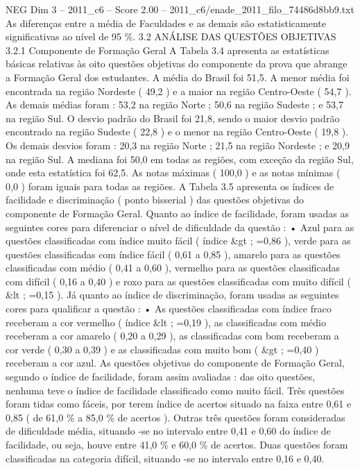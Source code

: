 \begin{textsample}{NEG Dim 3 – 2011\_c6 – Score 2.00 – 2011\_c6/enade\_2011\_filo\_74486d8bb9.txt}
As diferenças entre a média de Faculdades e as demais são estatisticamente significativas ao nível de 95 \%. 3.2 ANÁLISE DAS QUESTÕES OBJETIVAS 3.2.1 Componente de Formação Geral A Tabela 3.4 apresenta as estatísticas básicas relativas às oito questões objetivas do componente da prova que abrange a Formação Geral dos estudantes.
A média do Brasil foi 51,5.
A menor média foi encontrada na região Nordeste ( 49,2 ) e a maior na região Centro-Oeste ( 54,7 ).
As demais médias foram : 53,2 na região Norte ; 50,6 na região Sudeste ; e 53,7 na região Sul.
O desvio padrão do Brasil foi 21,8, sendo o maior desvio padrão encontrado na região Sudeste ( 22,8 ) e o menor na região Centro-Oeste ( 19,8 ).
Os demais desvios foram : 20,3 na região Norte ; 21,5 na região Nordeste ; e 20,9 na região Sul.
A mediana foi 50,0 em todas as regiões, com exceção da região Sul, onde esta estatística foi 62,5.
As notas máximas ( 100,0 ) e as notas mínimas ( 0,0 ) foram iguais para todas as regiões.
A Tabela 3.5 apresenta os índices de facilidade e discriminação ( ponto bisserial ) das questões objetivas do componente de Formação Geral.
Quanto ao índice de facilidade, foram usadas as seguintes cores para diferenciar o nível de dificuldade da questão : • Azul para as questões classificadas com índice muito fácil ( índice \&gt ; =0,86 ), verde para as questões classificadas com índice fácil ( 0,61 a 0,85 ), amarelo para as questões classificadas com médio ( 0,41 a 0,60 ), vermelho para as questões classificadas com difícil ( 0,16 a 0,40 ) e roxo para as questões classificadas com muito difícil ( \&lt ; =0,15 ).
Já quanto ao índice de discriminação, foram usadas as seguintes cores para qualificar a questão : • As questões classificadas com índice fraco receberam a cor vermelho ( índice \&lt ; =0,19 ), as classificadas com médio receberam a cor amarelo ( 0,20 a 0,29 ), as classificadas com bom receberam a cor verde ( 0,30 a 0,39 ) e as classificadas com muito bom ( \&gt ; =0,40 ) receberam a cor azul.
As questões objetivas do componente de Formação Geral, segundo o índice de facilidade, foram assim avaliadas : das oito questões, nenhuma teve o índice de facilidade classificado como muito fácil.
Três questões foram tidas como fáceis, por terem índice de acertos situado na faixa entre 0,61 e 0,85 ( de 61,0 \% a 85,0 \% de acertos ).
Outras três questões foram consideradas de dificuldade média, situando -se no intervalo entre 0,41 e 0,60 do índice de facilidade, ou seja, houve entre 41,0 \% e 60,0 \% de acertos.
Duas questões foram classificadas na categoria difícil, situando -se no intervalo entre 0,16 e 0,40.

\end{textsample}
